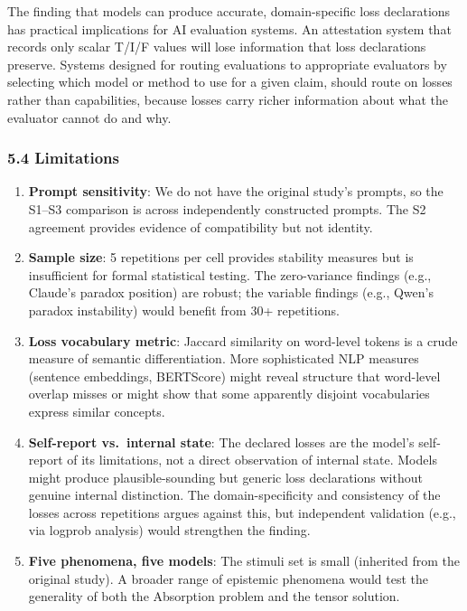 \documentclass[
]{article}
\begin{document}
The finding that models can produce accurate, domain-specific loss
declarations has practical implications for AI evaluation systems. An
attestation system that records only scalar T/I/F values will lose
information that loss declarations preserve. Systems designed for
routing evaluations to appropriate evaluators by selecting which model
or method to use for a given claim, should route on losses rather than
capabilities, because losses carry richer information about what the
evaluator cannot do and why.

\hypertarget{limitations}{%
\subsubsection{5.4 Limitations}\label{limitations}}

\begin{enumerate}
\def\labelenumi{\arabic{enumi}.}
\item
  \textbf{Prompt sensitivity}: We do not have the original study's
  prompts, so the S1--S3 comparison is across independently constructed
  prompts. The S2 agreement provides evidence of compatibility but not
  identity.
\item
  \textbf{Sample size}: 5 repetitions per cell provides stability
  measures but is insufficient for formal statistical testing. The
  zero-variance findings (e.g., Claude's paradox position) are robust;
  the variable findings (e.g., Qwen's paradox instability) would benefit
  from 30+ repetitions.
\item
  \textbf{Loss vocabulary metric}: Jaccard similarity on word-level
  tokens is a crude measure of semantic differentiation. More
  sophisticated NLP measures (sentence embeddings, BERTScore) might
  reveal structure that word-level overlap misses or might show that
  some apparently disjoint vocabularies express similar concepts.
\item
  \textbf{Self-report vs.~internal state}: The declared losses are the
  model's self-report of its limitations, not a direct observation of
  internal state. Models might produce plausible-sounding but generic
  loss declarations without genuine internal distinction. The
  domain-specificity and consistency of the losses across repetitions
  argues against this, but independent validation (e.g., via logprob
  analysis) would strengthen the finding.
\item
  \textbf{Five phenomena, five models}: The stimuli set is small
  (inherited from the original study). A broader range of epistemic
  phenomena would test the generality of both the Absorption problem and
  the tensor solution.
\end{enumerate}
\end{document}
